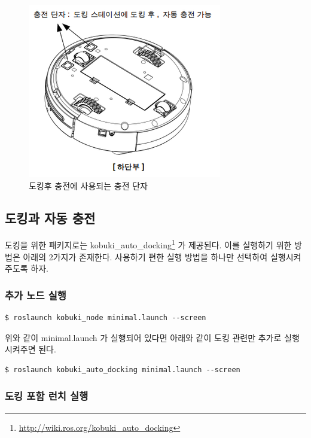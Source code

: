 \begin{figure}[h]
\centering\includegraphics[width=0.5\columnwidth]{pictures/chapter10/recharge.png}
\caption{도킹후 충전에 사용되는 충전 단자}
\end{figure}

\subsection{도킹과 자동 충전}

도킹을 위한 패키지로는 kobuki\_auto\_docking\footnote{\url{http://wiki.ros.org/kobuki_auto_docking}} 가 제공된다. 이를 실행하기 위한 방법은 아래의 2가지가 존재한다. 사용하기 편한 실행 방법을 하나만 선택하여 실행시켜 주도록 하자.

\subsubsection{추가 노드 실행}

\vspace{\baselineskip}
\begin{lstlisting}[language=ROS]
$ roslaunch kobuki_node minimal.launch --screen 
\end{lstlisting}

위와 같이 minimal.launch 가 실행되어 있다면 아래와 같이 도킹 관련만 추가로 실행시켜주면 된다.
 
\vspace{\baselineskip}
\begin{lstlisting}[language=ROS]
$ roslaunch kobuki_auto_docking minimal.launch --screen
\end{lstlisting} 

\subsubsection{도킹 포함 런치 실행}

